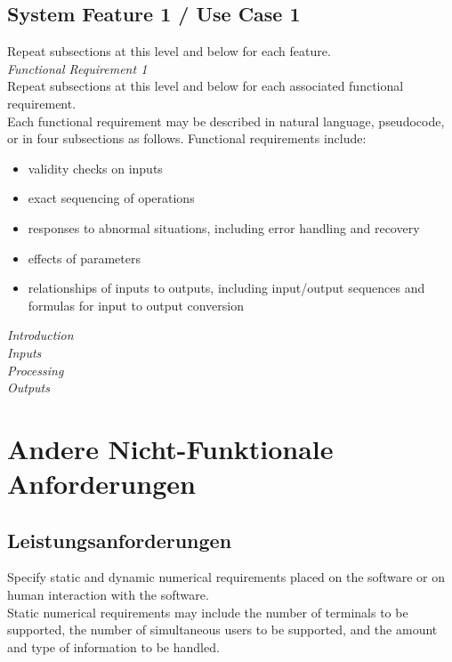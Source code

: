 \subsection{System Feature 1 / Use Case 1}
Repeat subsections at this level and below for each feature. \\[-0.3cm]

\noindent \textit{\large Functional Requirement 1} \\
Repeat subsections at this level and below for each associated functional requirement. \\[-0.3cm]

\noindent Each functional requirement may be described in natural language, pseudocode, or in four subsections as follows. Functional requirements include:
\begin{itemize}
	\item validity checks on inputs
	\item exact sequencing of operations
	\item responses to abnormal situations, including error handling and recovery
	\item effects of parameters
	\item relationships of inputs to outputs, including input/output sequences and formulas for input to output
conversion
\end{itemize}

\noindent \textit{\large Introduction} \\
\textit{\large Inputs} \\
\textit{\large Processing} \\
\textit{\large Outputs} \\

\newpage

\section{Andere Nicht-Funktionale Anforderungen}

\subsection{Leistungsanforderungen}
Specify static and dynamic numerical requirements placed on the software or on human interaction with the software. \\[-0.3cm]

\noindent Static numerical requirements may include the number of terminals to be supported, the number of simultaneous users to be supported, and the amount and type of information to be handled. \\[-0.3cm]

